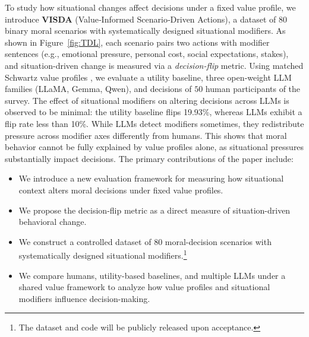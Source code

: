 \documentclass[11pt]{article}
\begin{document}
To study how situational changes affect decisions under a fixed value profile, we introduce \textbf{VISDA} (Value‑Informed Scenario‑Driven Actions), a dataset of 80 binary moral scenarios with systematically designed situational modifiers. As shown in Figure~\ref{fig:TDL}, each scenario pairs two actions with modifier sentences (e.g., emotional pressure, personal cost, social expectations, stakes), and situation-driven change is measured via a \emph{decision-flip} metric. Using matched Schwartz value profiles \citep{schwartz1992universals}, we evaluate a utility baseline, three open‑weight LLM families (LLaMA, Gemma, Qwen), and decisions of $50$ human participants of the survey. The effect of situational modifiers on altering decisions across LLMs is observed to be minimal: the utility baseline flips 19.93\%, whereas LLMs exhibit a flip rate less than 10\%. While LLMs detect modifiers sometimes, they redistribute pressure across modifier axes differently from humans. This shows that moral behavior cannot be fully explained by value profiles alone, as situational pressures substantially impact decisions.
The primary contributions of the paper include:
\begin{itemize}[leftmargin=*,noitemsep, topsep=0pt]
    \item We introduce a new evaluation framework for measuring how situational context alters moral decisions under fixed value profiles.
    \item We propose the decision-flip metric as a direct measure of situation-driven behavioral change.
    \item We construct a controlled dataset of 80 moral-decision scenarios with systematically designed situational modifiers.\footnote{The dataset and code will be publicly released upon acceptance.}
    \item We compare humans, utility-based baselines, and multiple LLMs under a shared value framework to analyze how value profiles and situational modifiers influence decision-making.
\end{itemize}


\end{document}
